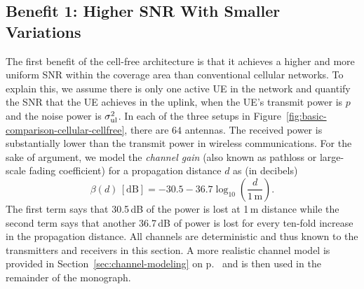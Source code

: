 \subsection{Benefit 1: Higher \gls{SNR} With Smaller Variations}\label{sec:benefits-distributed-antennas}

The first benefit of the cell-free architecture is that it achieves a higher and more uniform  \gls{SNR} within the coverage area than conventional cellular networks.
To explain this, we assume there is only one active \gls{UE} in the network and quantify the \gls{SNR} that the \gls{UE} achieves in the uplink, when the \gls{UE}'s transmit power is $p$ and the noise power is $\sigma^2_{\mathrm{ul}}$.
In each of the three setups in Figure~\ref{fig:basic-comparison-cellular-cellfree}, there are $64$ antennas. 
The received power is substantially lower than the transmit power in wireless communications. For the sake of argument, we model the \emph{channel gain} (also known as pathloss or large-scale fading coefficient) for a propagation distance $d$ as (in decibels)
\begin{equation}\label{eq:large-scale-model-simple}
\beta(d) \,  [\textrm{dB}] = -30.5 - 36.7 \log_{10}\left( \frac{d}{1\,\textrm{m}} \right).\end{equation}
The first term says that 30.5\,dB of the power is lost at 1\,m distance while the second term says that another 36.7\,dB of power is lost for every ten-fold increase in the propagation distance. All channels are deterministic and thus known to the transmitters and receivers in this section. A more realistic channel model is provided in Section~\ref{sec:channel-modeling} on p.~\pageref{sec:channel-modeling} and is then used in the remainder of the monograph.


